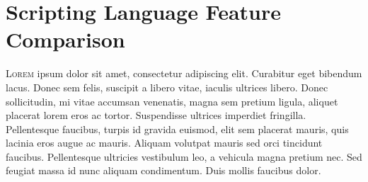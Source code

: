 \section{Scripting Language Feature Comparison}

\lettrine[nindent=0em,lines=3]{L}{orem} ipsum dolor sit amet, consectetur adipiscing elit. Curabitur eget bibendum lacus. Donec sem felis, suscipit a libero vitae, iaculis ultrices libero. Donec sollicitudin, mi vitae accumsan venenatis, magna sem pretium ligula, aliquet placerat lorem eros ac tortor. Suspendisse ultrices imperdiet fringilla. Pellentesque faucibus, turpis id gravida euismod, elit sem placerat mauris, quis lacinia eros augue ac mauris. Aliquam volutpat mauris sed orci tincidunt faucibus. Pellentesque ultricies vestibulum leo, a vehicula magna pretium nec. Sed feugiat massa id nunc aliquam condimentum. Duis mollis faucibus dolor.
